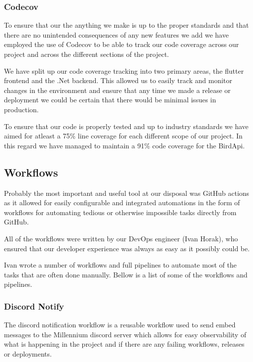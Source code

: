 \documentclass[a4paper]{article}
\begin{document}
\subsubsection{Codecov}
To ensure that our the anything we make is up to the proper standards and that 
there are no unintended consequences of any new features we add we have employed
the use of Codecov to be able to track our code coverage across our project and 
across the different sections of the project.
\newline

We have split up our code coverage tracking into two primary areas, the flutter frontend and the 
.Net backend. This allowed us to easily track and monitor changes in the environment and ensure
that any time we made a release or deployment we could be certain that there would be minimal 
issues in production.

To ensure that our code is properly tested and up to industry standards we have
aimed for atleast a 75\%  line coverage for each different scope of our project.
\newline
In this regard we have managed to maintain a 91\% code coverage for the BirdApi.

\subsection{Workflows}

Probably the most important and useful tool at our disposal was GitHub actions as it allowed for 
easily configurable and integrated automations in the form of workflows for automating tedious or 
otherwise impossible tasks directly from GitHub.\newline

All of the workflows were written by our DevOps engineer (Ivan Horak), who ensured that our developer
experience was always as easy as it possibly could be. 
\newline 

Ivan wrote a number of workflows and full pipelines to automate most of the tasks that are often 
done manually. Bellow is a list of some of the workflows and pipelines. 

\subsubsection{Discord Notify}

The discord notification workflow is a reusable workflow used to send embed messages 
to the Millennium discord server which allows for easy observability of what is happening
in the project and if there are any failing workflows, releases or deployments.
\end{document}
